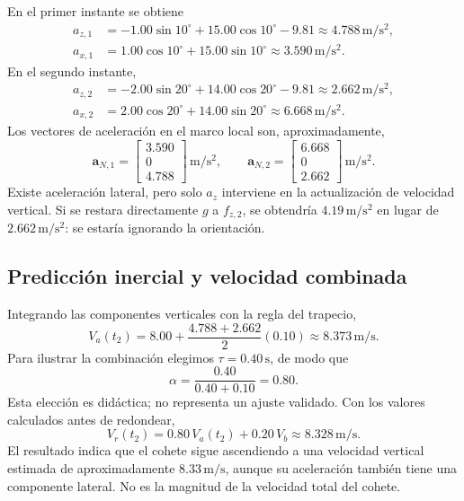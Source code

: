 \documentclass[11pt,a4paper]{article}
\begin{document}
\newpage
En el primer instante se obtiene
\begin{align}
 a_{z,1}&=-1.00\sin10^\circ+15.00\cos10^\circ-9.81
 \approx4.788\,\mathrm{m/s^2},\\
 a_{x,1}&=1.00\cos10^\circ+15.00\sin10^\circ
 \approx3.590\,\mathrm{m/s^2}.
\end{align}
En el segundo instante,
\begin{align}
 a_{z,2}&=-2.00\sin20^\circ+14.00\cos20^\circ-9.81
 \approx2.662\,\mathrm{m/s^2},\\
 a_{x,2}&=2.00\cos20^\circ+14.00\sin20^\circ
 \approx6.668\,\mathrm{m/s^2}.
\end{align}
Los vectores de aceleración en el marco local son, aproximadamente,
\begin{equation}
 \mathbf a_{N,1}=\begin{bmatrix}3.590\\0\\4.788\end{bmatrix}\,\mathrm{m/s^2},
 \qquad
 \mathbf a_{N,2}=\begin{bmatrix}6.668\\0\\2.662\end{bmatrix}\,\mathrm{m/s^2}.
\end{equation}
Existe aceleración lateral, pero solo $a_z$ interviene en la actualización de velocidad vertical. Si se restara directamente $g$ a $f_{z,2}$, se obtendría $4.19\,\mathrm{m/s^2}$ en lugar de $2.662\,\mathrm{m/s^2}$: se estaría ignorando la orientación.

\subsection{Predicción inercial y velocidad combinada}
Integrando las componentes verticales con la regla del trapecio,
\begin{equation}
 V_a(t_2)=8.00+\frac{4.788+2.662}{2}(0.10)
 \approx8.373\,\mathrm{m/s}.
\end{equation}
Para ilustrar la combinación elegimos $\tau=0.40\,\mathrm{s}$, de modo que
\begin{equation}
 \alpha=\frac{0.40}{0.40+0.10}=0.80.
\end{equation}
Esta elección es didáctica; no representa un ajuste validado. Con los valores calculados antes de redondear,
\begin{equation}
 V_r(t_2)=0.80\,V_a(t_2)+0.20\,V_b
 \approx\boxed{8.328\,\mathrm{m/s}}.
\end{equation}
El resultado indica que el cohete sigue ascendiendo a una velocidad vertical estimada de aproximadamente $8.33\,\mathrm{m/s}$, aunque su aceleración también tiene una componente lateral. No es la magnitud de la velocidad total del cohete.
\end{document}
